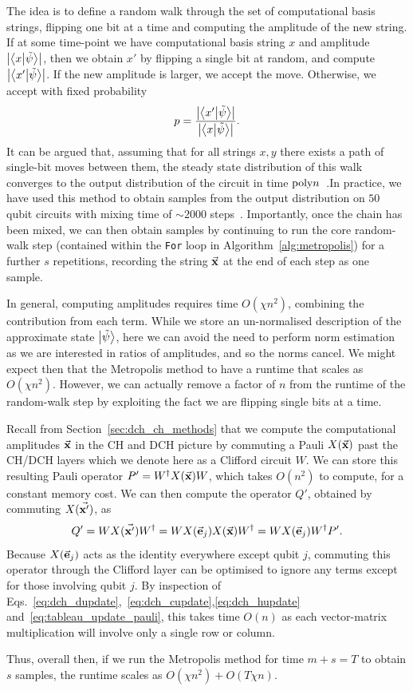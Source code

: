 The idea is to define a random walk through the set of computational basis strings, flipping one bit at a time and computing the amplitude of the new string. If at some time-point we have computational basis string $x$ and amplitude $\left|\braket{x}{\tilde{\psi}}\right|$, then we obtain $x'$ by flipping a single bit at random, and compute $\left|\braket{x'}{\tilde{\psi}}\right|$. If the new amplitude is larger, we accept the move. Otherwise, we accept with fixed probability
\[p = \frac{\left|\braket{x'}{\tilde{\psi}}\right|}{\left|\braket{x}{\tilde{\psi}}\right|}.\]
It can be argued that, assuming that for all strings $x, y$ there exists a path of single-bit moves between them, the steady state distribution of this walk converges to the output distribution of the circuit in time $\text{poly}{n}$~\cite{Bravyi2018}.In practice, we have used this method to obtain samples from the output distribution on $50$ qubit circuits with mixing time of $\sim 2000$ steps~\cite{Bravyi2018}. Importantly, once the chain has been mixed, we can then obtain samples by continuing to run the core random-walk step (contained within the \texttt{For} loop in Algorithm~\ref{alg:metropolis}) for a further $s$ repetitions, recording the string $\va{x}$ at the end of each step as one sample.\par
In general, computing amplitudes requires time $O\left(\chi n^{2}\right)$, combining the contribution from each term. While we store an un-normalised description of the approximate state $\ket{\tilde{\psi}}$, here we can avoid the need to perform norm estimation as we are interested in ratios of amplitudes, and so the norms cancel. We might expect then that the Metropolis method to have a runtime that scales as $O\left(\chi n^{2}\right)$. However, we can actually remove a factor of $n$ from the runtime of the random-walk step by exploiting the fact we are flipping single bits at a time.\par
Recall from Section~\ref{sec:dch_ch_methods} that we compute the computational amplitudes $\va{x}$ in the CH and DCH picture by commuting a Pauli $X(\va{x})$ past the CH/DCH layers which we denote here as a Clifford circuit $W$. We can store this resulting Pauli operator $P'=W^{\dagger}X(\va{x})W$, which takes $O(n^{2})$ to compute, for a constant memory cost. We can then compute the operator $Q'$, obtained by commuting $X(\va{x'})$, as
\[Q' = WX(\va{x'})W^{\dagger} = WX(\va{e}_{j})X(\va{x})W^{\dagger} = WX(\va{e}_{j})W^{\dagger} P'.\]
Because $X(\va{e}_{j})$ acts as the identity everywhere except qubit $j$, commuting this operator through the Clifford layer can be optimised to ignore any terms except for those involving qubit $j$. By inspection of Eqs.~\ref{eq:dch_dupdate},~\ref{eq:dch_cupdate},\ref{eq:dch_hupdate} and~\ref{eq:tableau_update_pauli}, this takes time $O(n)$ as each vector-matrix multiplication will involve only a single row or column.\par
Thus, overall then, if we run the Metropolis method for time $m+s=T$ to obtain $s$ samples, the runtime scales as $O\left(\chi n^{2}\right)+O\left(T\chi n\right)$.
